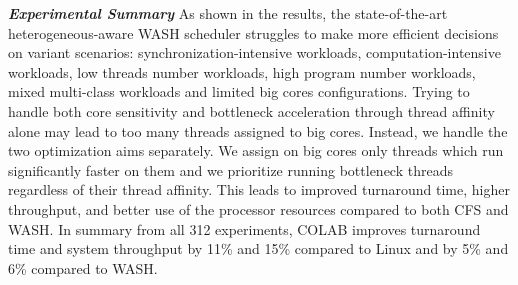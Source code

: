 


\textbf{\textit{Experimental Summary}} As shown in the results, the state-of-the-art heterogeneous-aware WASH scheduler struggles to make more efficient decisions on variant scenarios: synchronization-intensive workloads, computation-intensive workloads, low threads number workloads, high program number workloads, mixed multi-class workloads and limited big cores configurations. Trying to handle both core sensitivity and bottleneck acceleration through thread affinity alone may lead to too many threads assigned to big cores. Instead, we handle the two optimization aims separately. We assign on big cores only threads which run significantly faster on them and we prioritize running bottleneck threads regardless of their thread affinity. This leads to improved turnaround time, higher throughput, and better use of the processor resources compared to both CFS and WASH. In summary from all 312 experiments, COLAB improves turnaround time and system throughput by 11\% and 15\% compared to Linux and by 5\% and 6\% compared to WASH.



